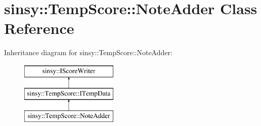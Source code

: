\hypertarget{classsinsy_1_1TempScore_1_1NoteAdder}{\section{sinsy\-:\-:\-Temp\-Score\-:\-:\-Note\-Adder \-Class \-Reference}
\label{classsinsy_1_1TempScore_1_1NoteAdder}
}
\-Inheritance diagram for sinsy\-:\-:\-Temp\-Score\-:\-:\-Note\-Adder\-:\begin{figure}[H]
\begin{center}
\leavevmode
\includegraphics[height=3.000000cm]{classsinsy_1_1TempScore_1_1NoteAdder}
\end{center}
\end{figure}
